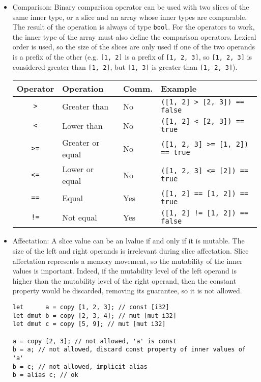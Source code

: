 \begin{itemize}
\item Comparison: Binary comparison operator can be used with two slices of the
  same inner type, or a slice and an array whose inner types are comparable. The
  result of the operation is always of type \texttt{bool}. For the operators to
  work, the inner type of the array must also define the comparison operators.
  Lexical order is used, so the size of the slices are only used if one of the
  two operands is a prefix of the other (e.g. \texttt{[1, 2]} is a prefix of
  \texttt{[1, 2, 3]}, so \texttt{[1, 2, 3]} is considered greater than
  \texttt{[1, 2]}, but \texttt{[1, 3]} is greater than \texttt{[1, 2, 3]}).

  \begin{center}\begin{adjustbox}{max width=1.0\linewidth}
    \begin{tabular}{|c|lll|}
      \hline
      Operator & Operation & Comm. & Example\\
      \hline
      \hline
      \texttt{>}      & Greater than     & No          & \texttt{([1, 2] > [2, 3]) == false}    \\
      \texttt{<}      & Lower than       & No          & \texttt{([1, 2] < [2, 3]) == true}     \\
      \texttt{>=}     & Greater or equal & No          & \texttt{([1, 2, 3] >= [1, 2]) == true} \\
      \texttt{<=}     & Lower or equal   & No          & \texttt{([1, 2, 3] <= [2]) == true}    \\
      \texttt{==}     & Equal            & Yes         & \texttt{([1, 2] == [1, 2]) == true}    \\
      \texttt{!=}     & Not equal        & Yes         & \texttt{([1, 2] != [1, 2]) == false}   \\
      \hline
    \end{tabular}
  \end{adjustbox}\end{center}

\item Affectation: A slice value can be an lvalue if and only if it is mutable.
  The size of the left and right operands is irrelevant during slice
  affectation. Slice affectation represents a memory movement, so the mutability
  of the inner values is important. Indeed, if the mutability level of the left
  operand is higher than the mutability level of the right operand, then the
  constant property would be discarded, removing its guarantee, so it is not
  allowed.

  \begin{lstlisting}[style=coloredverbatim]
let      a = copy [1, 2, 3]; // const [i32]
let dmut b = copy [2, 3, 4]; // mut [mut i32]
let dmut c = copy [5, 9]; // mut [mut i32]

a = copy [2, 3]; // not allowed, 'a' is const
b = a; // not allowed, discard const property of inner values of 'a'
b = c; // not allowed, implicit alias
b = alias c; // ok
  \end{lstlisting}

\end{itemize}


